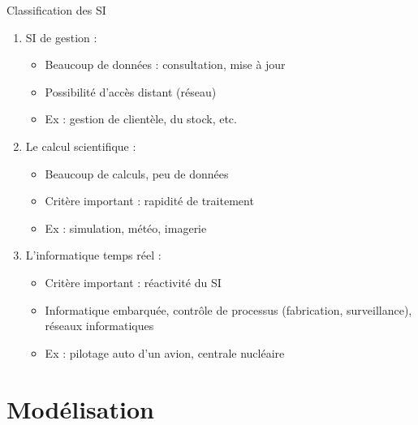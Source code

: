 \documentclass[14pt]{beamer}
\begin{document}
\begin{framentitle}{Classification des SI}
    \begin{enumerate}
        \item SI de gestion :
            \begin{itemize}
                \item Beaucoup de données : consultation, mise à
                    jour
                \item Possibilité d'accès distant (réseau)
                \item Ex : gestion de clientèle, du stock, etc.
            \end{itemize}
        \item Le calcul scientifique :
            \begin{itemize}
                \item Beaucoup de calculs, peu de données
                \item Critère important : rapidité de traitement
                \item Ex : simulation, météo, imagerie
            \end{itemize}
        \item L'informatique temps réel :
            \begin{itemize}
                \item Critère important : réactivité du SI
                \item Informatique embarquée, contrôle de
                    processus (fabrication, surveillance), réseaux informatiques
                \item Ex : pilotage auto d'un avion, centrale nucléaire
            \end{itemize}
    \end{enumerate}
\end{framentitle}

\section{Modélisation}
\end{document}
